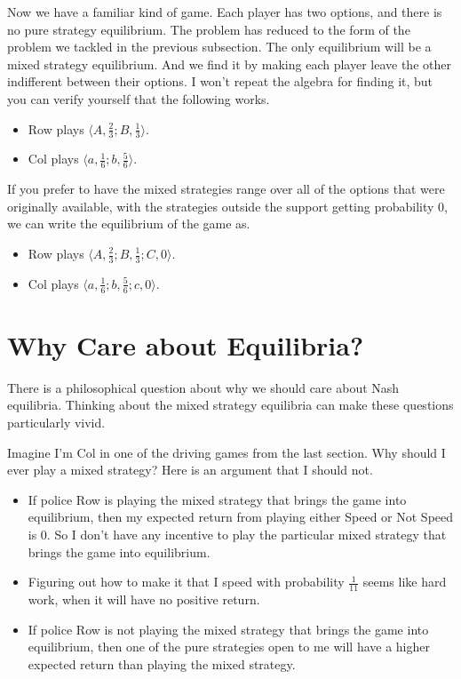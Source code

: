 \documentclass[
  11pt,
  letterpaper,
]{scrbook}
\providecommand{\tightlist}{%
  \setlength{\itemsep}{0pt}\setlength{\parskip}{0pt}}
\begin{document}
Now we have a familiar kind of game. Each player has two options, and
there is no pure strategy equilibrium. The problem has reduced to the
form of the problem we tackled in the previous subsection. The only
equilibrium will be a mixed strategy equilibrium. And we find it by
making each player leave the other indifferent between their options. I
won't repeat the algebra for finding it, but you can verify yourself
that the following works.

\begin{itemize}
\tightlist
\item
  Row plays \(\langle A, \frac{2}{3}; B, \frac{1}{3} \rangle\).
\item
  Col plays \(\langle a, \frac{1}{6}; b, \frac{5}{6} \rangle\).
\end{itemize}

If you prefer to have the mixed strategies range over all of the options
that were originally available, with the strategies outside the support
getting probability 0, we can write the equilibrium of the game as.

\begin{itemize}
\tightlist
\item
  Row plays \(\langle A, \frac{2}{3}; B, \frac{1}{3}; C, 0 \rangle\).
\item
  Col plays \(\langle a, \frac{1}{6}; b, \frac{5}{6}; c, 0 \rangle\).
\end{itemize}

\section{Why Care about Equilibria?}\label{sec-why-care}

There is a philosophical question about why we should care about Nash
equilibria. Thinking about the mixed strategy equilibria can make these
questions particularly vivid.

Imagine I'm Col in one of the driving games from the last section. Why
should I ever play a mixed strategy? Here is an argument that I should
not.

\begin{itemize}
\tightlist
\item
  If police Row is playing the mixed strategy that brings the game into
  equilibrium, then my expected return from playing either Speed or Not
  Speed is 0. So I don't have any incentive to play the particular mixed
  strategy that brings the game into equilibrium.
\item
  Figuring out how to make it that I speed with probability
  \(\frac{1}{11}\) seems like hard work, when it will have no positive
  return.
\item
  If police Row is not playing the mixed strategy that brings the game
  into equilibrium, then one of the pure strategies open to me will have
  a higher expected return than playing the mixed strategy.
\end{itemize}
\end{document}
